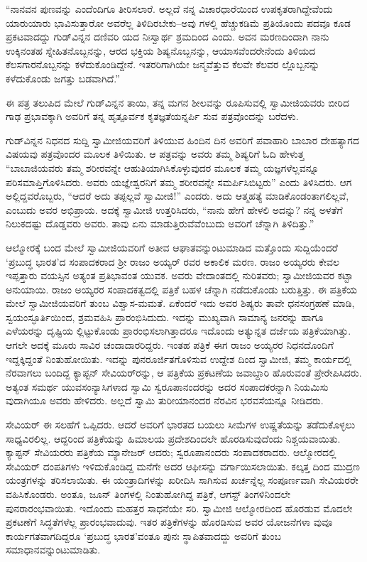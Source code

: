 “ನಾನವನ ಪುಣವನ್ನು ಎಂದೆಂದಿಗೂ ತೀರಿಸಲಾರೆ. ಅಲ್ಲದೆ ನನ್ನ ವಿಚಾರಧಾರೆಯಿಂದ ಉಪಕೃತರಾಗಿದ್ದೇವೆಂದು ಯಾರುಯಾರು ಭಾವಿಸುತ್ತಾರೋ ಅವರೆಲ್ಲ ತಿಳಿದಿರಬೇಕು–ಅವು ಗಳಲ್ಲಿ ಹೆಚ್ಚುಕಡಿಮೆ ಪ್ರತಿಯೊಂದು ಪದವೂ ಕೂಡ ಪ್ರಕಟವಾದದ್ದು ಗುಡ್​ವಿನ್ನನ ದಣಿವರಿ ಯದ ನಿಃಸ್ವಾರ್ಥ ಶ್ರಮದಿಂದ ಎಂದು. ಅವನ ಮರಣದಿಂದಾಗಿ ನಾನು ಉಕ್ಕಿನಂತಹ ಸ್ನೇಹಿತನೊಬ್ಬನನ್ನು, ಆರದ ಭಕ್ತಿಯ ಶಿಷ್ಯನೊಬ್ಬನನ್ನು, ಆಯಾಸವೆಂದರೇನೆಂದು ತಿಳಿಯದ ಕೆಲಸಗಾರನೊಬ್ಬನನ್ನು ಕಳೆದುಕೊಂಡಿದ್ದೇನೆ. ಇತರರಿಗಾಗಿಯೇ ಜನ್ಮವೆತ್ತುವ ಕೆಲವೇ ಕೆಲವರ ಲ್ಲೊಬ್ಬನನ್ನು ಕಳೆದುಕೊಂಡು ಜಗತ್ತು ಬಡವಾಗಿದೆ.”

ಈ ಪತ್ರ ತಲುಪಿದ ಮೇಲೆ ಗುಡ್​ವಿನ್ನನ ತಾಯಿ, ತನ್ನ ಮಗನ ಶೀಲವನ್ನು ರೂಪಿಸುವಲ್ಲಿ ಸ್ವಾಮೀಜಿಯವರು ಬೀರಿದ ಗಾಢ ಪ್ರಭಾವಕ್ಕಾಗಿ ಅವರಿಗೆ ತನ್ನ ಹೃತ್ಪೂರ್ವಕ ಕೃತಜ್ಞತೆಯನ್ನರ್ಪಿ ಸುವ ಪತ್ರವೊಂದನ್ನು ಬರೆದಳು.

ಗುಡ್​ವಿನ್ನನ ನಿಧನದ ಸುದ್ದಿ ಸ್ವಾಮೀಜಿಯವರಿಗೆ ತಿಳಿಯುವ ಹಿಂದಿನ ದಿನ ಅವರಿಗೆ ಪವಾಹಾರಿ ಬಾಬಾರ ದೇಹತ್ಯಾಗದ ವಿಷಯವು ಪತ್ರವೊಂದರ ಮೂಲಕ ತಿಳಿಯಿತು. ಆ ಪತ್ರವನ್ನು ಅವರು ತಮ್ಮ ಶಿಷ್ಯರಿಗೆ ಓದಿ ಹೇಳುತ್ತ “ಬಾಬಾಜಿಯವರು ತಮ್ಮ ಶರೀರವನ್ನೇ ಆಹುತಿಯಾಗಿಸಿಕೊಳ್ಳುವುದರ ಮೂಲಕ ತಮ್ಮ ಯಜ್ಞಗಳೆಲ್ಲವನ್ನೂ ಪರಿಸಮಾಪ್ತಿಗೊಳಿಸಿದರು. ಅವರು ಯಜ್ಞೇಶ್ವರನಿಗೆ ತಮ್ಮ ಶರೀರವನ್ನೇ ಸಮರ್ಪಿಸಿಬಿಟ್ಟರು” ಎಂದು ತಿಳಿಸಿದರು. ಆಗ ಅಲ್ಲಿದ್ದವರೊಬ್ಬರು, “ಆದರೆ ಅದು ತಪ್ಪಲ್ಲವೆ ಸ್ವಾಮೀಜಿ!” ಎಂದರು. ಅದು ಆತ್ಮಹತ್ಯೆ ಮಾಡಿಕೊಂಡಂತಾಗಲಿಲ್ಲವೆ, ಎಂಬುದು ಅವರ ಅಭಿಪ್ರಾಯ. ಅದಕ್ಕೆ ಸ್ವಾಮೀಜಿ ಉತ್ತರಿಸಿದರು, “ನಾನು ಹೇಗೆ ಹೇಳಲಿ ಅದನ್ನು? ನನ್ನ ಅಳತೆಗೆ ನಿಲುಕದಷ್ಟು ದೊಡ್ಡವರು ಅವರು. ತಾವು ಏನು ಮಾಡುತ್ತಿರುವೆವೆಂಬುದು ಅವರಿಗೆ ಚೆನ್ನಾಗಿ ತಿಳಿದಿತ್ತು.”

ಆಲ್ಮೋರಕ್ಕೆ ಬಂದ ಮೇಲೆ ಸ್ವಾಮೀಜಿಯವರಿಗೆ ಅತೀವ ಆಘಾತವನ್ನುಂಟುಮಾಡಿದ ಮತ್ತೊಂದು ಸುದ್ದಿಯೆಂದರೆ ‘ಪ್ರಬುದ್ಧ ಭಾರತ’ದ ಸಂಪಾದಕರಾದ ಶ್ರೀ ರಾಜಂ ಅಯ್ಯರ್ ರವರ ಅಕಾಲಿಕ ಮರಣ. ರಾಜಂ ಅಯ್ಯರರು ಕೇವಲ ಇಪ್ಪತ್ತಾರು ವಯಸ್ಸಿನ ಅತ್ಯಂತ ಪ್ರತಿಭಾವಂತ ಯುವಕ. ಅವರು ವೇದಾಂತದಲ್ಲಿ ನುರಿತವರು; ಸ್ವಾಮೀಜಿಯವರ ಕಟ್ಟಾ ಅನುಯಾಯಿ. ರಾಜಂ ಅಯ್ಯರರ ಸಂಪಾದಕತ್ವದಲ್ಲಿ ಪತ್ರಿಕೆ ಬಹಳ ಚೆನ್ನಾಗಿ ನಡೆದುಕೊಂಡು ಬರುತ್ತಿತ್ತು. ಈ ಪತ್ರಿಕೆಯ ಮೇಲೆ ಸ್ವಾಮೀಜಿಯವರಿಗೆ ತುಂಬ ವಿಶ್ವಾಸ-ಮಮತೆ. ಏಕೆಂದರೆ ಇದು ಅವರ ಶಿಷ್ಯರು ತಾವೇ ಧನಸಂಗ್ರಹಣೆ ಮಾಡಿ, ಸ್ವಯಂಸ್ಫೂರ್ತಿಯಿಂದ, ಶ್ರಮವಹಿಸಿ ಪ್ರಾರಂಭಿಸಿದುದು. ಇದನ್ನು ಮುಖ್ಯವಾಗಿ ಸಾಮಾನ್ಯ ಜನರನ್ನು ಹಾಗೂ ಎಳೆಯರನ್ನು ದೃಷ್ಟಿಯ ಲ್ಲಿಟ್ಟುಕೊಂಡು ಪ್ರಾರಂಭಿಸಲಾಗಿತ್ತಾದರೂ ಇದೊಂದು ಅತ್ಯುನ್ನತ ದರ್ಜೆಯ ಪತ್ರಿಕೆಯಾಗಿತ್ತು. ಆಗಲೇ ಅದಕ್ಕೆ ಮೂರು ಸಾವಿರ ಚಂದಾದಾರರಿದ್ದರು. ಇಂತಹ ಪತ್ರಿಕೆ ಈಗ ರಾಜಂ ಅಯ್ಯರರ ನಿಧನದೊಂದಿಗೆ ಇದ್ದಕ್ಕಿದ್ದಂತೆ ನಿಂತುಹೋಯಿತು. ಇದನ್ನು ಪುನರೂರ್ಜಿತಗೊಳಿಸುವ ಉದ್ದೇಶ ದಿಂದ ಸ್ವಾಮೀಜಿ, ತಮ್ಮ ಕಾರ್ಯದಲ್ಲಿ ನೆರವಾಗಲು ಬಂದಿದ್ದ ಕ್ಯಾಪ್ಟನ್ ಸೇವಿಯರ್​ರನ್ನು, ಆ ಪತ್ರಿಕೆಯ ಪ್ರಕಟಣೆಯ ಜವಾಬ್ದಾರಿ ಹೊರುವಂತೆ ಪ್ರೇರೇಪಿಸಿದರು. ಅತ್ಯಂತ ಸಮರ್ಥ ಯುವಸಂನ್ಯಾಸಿಗಳಾದ ಸ್ವಾಮಿ ಸ್ವರೂಪಾನಂದರನ್ನು ಅದರ ಸಂಪಾದಕರನ್ನಾಗಿ ನಿಯಮಿಸು ವುದಾಗಿಯೂ ಅವರು ಹೇಳಿದರು. ಅಲ್ಲದೆ ಸ್ವಾಮಿ ತುರೀಯಾನಂದರ ನೆರವಿನ ಭರವಸೆಯನ್ನೂ ನೀಡಿದರು.

ಸೇವಿಯರ್ ಈ ಸಲಹೆಗೆ ಒಪ್ಪಿದರು. ಆದರೆ ಅವರಿಗೆ ಭಾರತದ ಬಯಲು ಸೀಮೆಗಳ ಉಷ್ಣತೆಯನ್ನು ತಡೆದುಕೊಳ್ಳಲು ಸಾಧ್ಯವಿರಲಿಲ್ಲ. ಆದ್ದರಿಂದ ಪತ್ರಿಕೆಯನ್ನು ಹಿಮಾಲಯ ಪ್ರದೇಶದಿಂದಲೇ ಹೊರಡಿಸುವುದೆಂದು ನಿಶ್ಚಯವಾಯಿತು. ಕ್ಯಾಪ್ಟನ್ ಸೇವಿಯರರು ಪತ್ರಿಕೆಯ ಮ್ಯಾನೇಜರ್ ಆದರು; ಸ್ವರೂಪಾನಂದರು ಸಂಪಾದಕರಾದರು. ಆಲ್ಮೋರದಲ್ಲಿ ಸೇವಿಯರ್ ದಂಪತಿಗಳು ಇಳಿದುಕೊಂಡಿದ್ದ ಮನೆಗೇ ಅದರ ಆಫೀಸನ್ನು ವರ್ಗಾಯಿಸಲಾಯಿತು. ಕಲ್ಕತ್ತ ದಿಂದ ಮುದ್ರಣ ಯಂತ್ರಗಳನ್ನು ತರಿಸಲಾಯಿತು. ಈ ಯಂತ್ರಾದಿಗಳನ್ನು ಖರೀದಿಸಿ ಸಾಗಿಸುವ ಖರ್ಚನ್ನೆಲ್ಲ ಸಂಪೂರ್ಣವಾಗಿ ಸೇವಿಯರರೇ ವಹಿಸಿಕೊಂಡರು. ಅಂತೂ, ಜೂನ್ ತಿಂಗಳಲ್ಲಿ ನಿಂತುಹೋಗಿದ್ದ ಪತ್ರಿಕೆ, ಆಗಸ್ಟ್ ತಿಂಗಳಿನಿಂದಲೇ ಪುನರಾರಂಭವಾಯಿತು. ಇದೊಂದು ಮಹತ್ತರ ಸಾಧನೆಯೇ ಸರಿ. ಸ್ವಾಮೀಜಿ ಆಲ್ಮೋರದಿಂದ ಹೊರಡುವ ಮೊದಲೇ ಪ್ರಕಟಣೆಗೆ ಸಿದ್ಧತೆಗಳೆಲ್ಲ ಪ್ರಾರಂಭವಾದುವು. ಇತರ ಪತ್ರಿಕೆಗಳನ್ನು ಹೊರಡಿಸುವ ಅವರ ಯೋಜನೆಗಳಾ ವುವೂ ಕಾರ್ಯಗತವಾಗದಿದ್ದರೂ ‘ಪ್ರಬುದ್ಧ ಭಾರತ’ವಂತೂ ಪುನಃ ಸ್ಥಾಪಿತವಾದದ್ದು ಅವರಿಗೆ ತುಂಬ ಸಮಾಧಾನವನ್ನುಂಟುಮಾಡಿತು.

